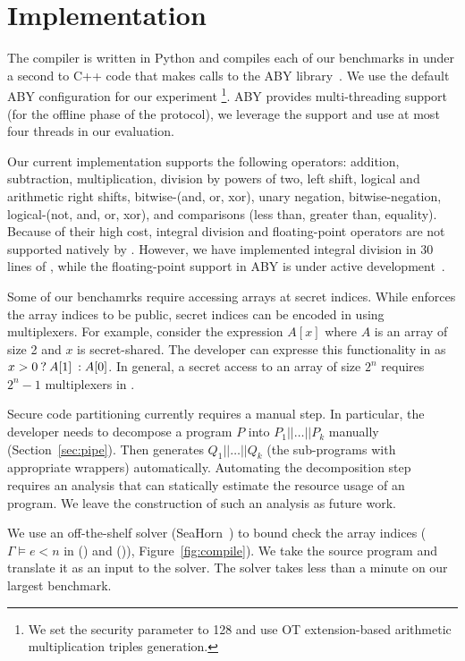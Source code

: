 \section{Implementation}
\label{sec:impl}
The  \tool compiler is written in Python and
compiles each of our benchmarks in under a second to C++ code that
makes calls to the ABY
library~\cite{aby}. We use the default ABY configuration for our
experiment \footnote{We set the security parameter to 128 and use OT
extension-based arithmetic multiplication triples generation.}. ABY
provides multi-threading support (for the offline phase of the
protocol), we leverage the support and use at most four threads in our
evaluation.

Our current implementation supports the following operators:
addition, subtraction, multiplication, division by powers of two, left
shift,
logical and arithmetic right shifts, bitwise-(and, or, xor), unary
negation, 
bitwise-negation, logical-(not, and, or, xor), and comparisons (less
than, greater than, equality). 
Because of their high cost, integral division and floating-point
operators are not supported natively by \tool. 
However, we have implemented integral division in 30 lines of \tool,
while the floating-point support in ABY is under active
development~\cite{ddkssz15}.


Some of our benchamrks require accessing arrays at secret
indices. While \tool enforces the array indices to be
public, secret indices can be encoded in \tool using multiplexers.
For example, consider the expression $A[x]$ where $A$ is an array of
size 2 and $x$ is secret-shared. The developer can expresse
this functionality in \tool as ${{x > 0}\:?\:{A[1]}\::{A[0]}}$. In general,
a secret access to an array of
size $2^n$ requires $2^{n}-1$ multiplexers in \tool.

 Secure code partitioning currently requires a manual step.
In particular, the developer needs to decompose a program $P$ into
$P_1||\ldots||P_k$ manually (Section~\ref{sec:pipe}). Then \tool
generates $Q_1||\ldots||Q_k$ (the sub-programs with appropriate
wrappers) automatically.
Automating the decomposition step requires an analysis that can 
statically estimate the resource usage of an \tool program. We leave
the construction of such an analysis as future work.

We use an off-the-shelf solver
(SeaHorn~\cite{seahorn}) to bound check the array indices
($\Gamma\vDash e < n$
in ({}) and ({})),
Figure~\ref{fig:compile}). We take the \tool source program and
translate it as an input to the solver. The solver takes less
than a minute on our largest benchmark.

